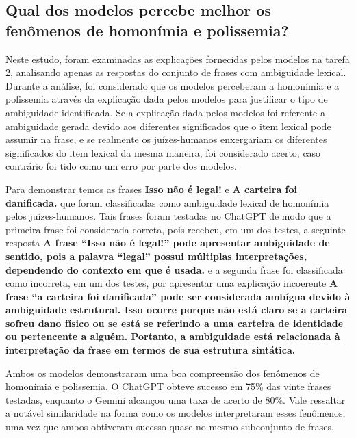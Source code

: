 \subsection{Qual dos modelos percebe melhor os fenômenos de homonímia e polissemia?}\label{resultados-q-4}


Neste estudo, foram examinadas as explicações fornecidas pelos modelos na tarefa 2, analisando apenas as respostas do conjunto de frases com ambiguidade lexical. Durante a análise, foi considerado que os modelos perceberam a homonímia e a polissemia através da explicação dada pelos modelos para justificar o tipo de ambiguidade identificada. Se a explicação dada pelos modelos foi referente a ambiguidade gerada devido aos diferentes significados que o item lexical pode assumir na frase, e se realmente os juízes-humanos enxergariam os diferentes significados do item lexical da mesma maneira, foi considerado acerto, caso contrário foi tido como um erro por parte dos modelos. 

Para demonstrar temos as frases \textbf{Isso não é legal!} e \textbf{A carteira foi danificada.} que foram classificadas como ambiguidade lexical de homonímia pelos juízes-humanos. Tais frases foram testadas no ChatGPT de modo que a primeira frase foi considerada correta, pois recebeu, em um dos testes, a seguinte resposta \textbf{A frase \enquote{Isso não é legal!} pode apresentar ambiguidade de sentido, pois a palavra \enquote{legal} possui múltiplas interpretações, dependendo do contexto em que é usada.} e a segunda frase foi classificada como incorreta, em um dos testes, por apresentar uma explicação incoerente \textbf{A frase \enquote{a carteira foi danificada} pode ser considerada ambígua devido à ambiguidade estrutural. Isso ocorre porque não está claro se a carteira sofreu dano físico ou se está se referindo a uma carteira de identidade ou pertencente a alguém. Portanto, a ambiguidade está relacionada à interpretação da frase em termos de sua estrutura sintática.}


Ambos os modelos demonstraram uma boa compreensão dos fenômenos de homonímia e polissemia. O ChatGPT obteve sucesso em 75\% das vinte frases testadas, enquanto o Gemini alcançou uma taxa de acerto de 80\%. Vale ressaltar a notável similaridade na forma como os modelos interpretaram esses fenômenos, uma vez que ambos obtiveram sucesso quase no mesmo subconjunto de frases.





